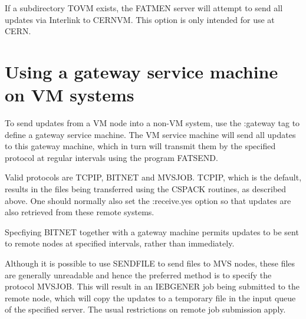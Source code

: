 If a subdirectory TOVM exists, the FATMEN server will attempt to send
all updates via Interlink to CERNVM. This option is only intended for
use at CERN.
\section{Using a gateway service machine on VM systems}
\par
To send updates from a VM node into a non-VM system,
use the :gateway tag to define a gateway service machine.
The VM service machine will send all updates to this
gateway machine, which in turn will transmit them by
the specified protocol at regular intervals using the
program FATSEND.
\par
Valid protocols are TCPIP, BITNET and MVSJOB.
TCPIP, which is the default, results in the files
being transferred using the CSPACK routines, as
described above. One should normally also set the
:receive.yes option so that updates are also retrieved
from these remote systems.
\par
Specfiying BITNET together with a gateway machine permits
updates to be sent to remote nodes at specified
intervals, rather than immediately.
\par
Although it is possible to use SENDFILE to send files to
MVS nodes, these files are generally unreadable and
hence the preferred method is to specify the protocol
MVSJOB. This will result in an IEBGENER job being submitted
to the remote node, which will copy the updates to a temporary
file in the input queue of the specified server.
The usual restrictions on remote job submission apply.
